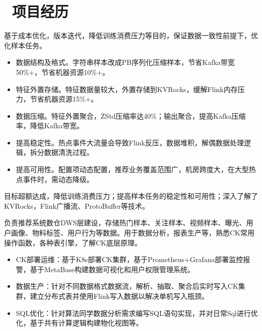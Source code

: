 \documentclass{resume}
\begin{document}

\section{\faPencilSquare\ 项目经历}

\begin{onehalfspacing}  基于成本优化，版本迭代，降低训练消费压力等目的，保证数据一致性前提下，优化样本任务。
\begin{itemize}
  \item 数据结构及格式。字符串样本改成PB序列化压缩样本，节省Kafka带宽50\%+，节省机器资源10\%+。
  \item 特征外置存储。特征数据量较大，外置存储到KVRocks，缓解Flink内存压力，节省机器资源15\%+。
  \item 数据压缩。特征外置聚合，ZStd压缩率达40\%；输出聚合，提高Kafka压缩率，降低Kafka带宽。
  \item 提高稳定性。热点事件大流量会导致Flink反压，数据堆积，解偶数据处理逻辑，拆分数据清洗过程。
  \item 提高可用性。配置项动态配置，推荐业务覆盖范围广，机房跨度大，在大型热点事件时，需动态降级。
 \end{itemize}
\end{onehalfspacing}
\begin{onehalfspacing}  目标超额达成，降低训练消费压力；提高样本任务的稳定性和可用性；深入了解了KVRocks，Flink广播流、ProtoBuffer等技术。
\end{onehalfspacing}

\begin{onehalfspacing}  负责推荐系统数仓DWS层建设，存储热门样本、关注样本、视频样本、曝光、用户画像、物料标签、用户行为等数据。用于数据分析，报表生产等，熟悉CK常用操作函数，各种表引擎，了解CK底层原理。
\begin{itemize}
 \item CK部署运维：基于K8s部署CK集群，基于Prometheus+Grafana部署监控报警，基于MetaBase构建数据可视化和用户权限管理系统。
 \item 数据生产：针对不同数据格式数据流，解析、抽取、聚合后实时写入CK集群，建立分布式表并使用Flink写入数据以解决单机写入瓶颈。
 \item SQL优化：针对算法同学数据分析需求编写SQL语句实现，并对日常Sql进行优化，基于共有计算逻辑构建物化视图等。
\end{itemize}
\end{onehalfspacing}
\end{document}
